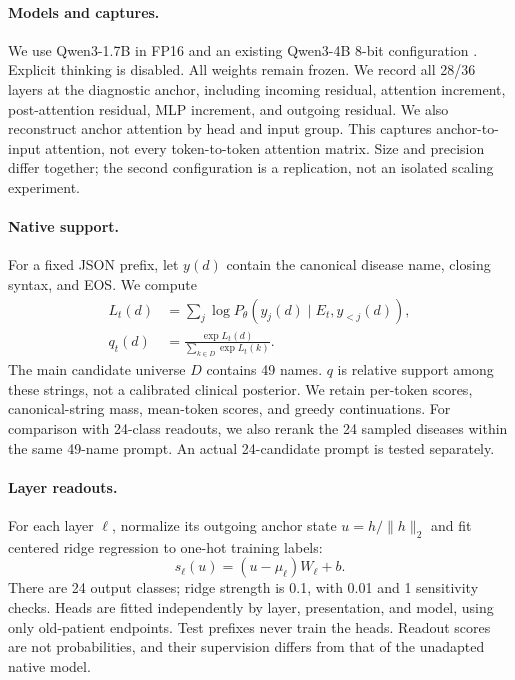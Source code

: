 \documentclass[11pt]{article}
\begin{document}
\paragraph{Models and captures.}
We use Qwen3-1.7B in FP16 and an existing Qwen3-4B 8-bit configuration \citep{qwen3}. Explicit thinking is disabled. All weights remain frozen. We record all 28/36 layers at the diagnostic anchor, including incoming residual, attention increment, post-attention residual, MLP increment, and outgoing residual. We also reconstruct anchor attention by head and input group. This captures anchor-to-input attention, not every token-to-token attention matrix. Size and precision differ together; the second configuration is a replication, not an isolated scaling experiment.

\paragraph{Native support.}
For a fixed JSON prefix, let $y(d)$ contain the canonical disease name, closing syntax, and EOS. We compute
\begin{align}
 L_t(d)&=\sum_j\log P_\theta(y_j(d)\mid E_t,y_{<j}(d)),\\
 q_t(d)&=\frac{\exp L_t(d)}{\sum_{k\in D}\exp L_t(k)}.
\end{align}
The main candidate universe $D$ contains 49 names. $q$ is relative support among these strings, not a calibrated clinical posterior. We retain per-token scores, canonical-string mass, mean-token scores, and greedy continuations. For comparison with 24-class readouts, we also rerank the 24 sampled diseases within the same 49-name prompt. An actual 24-candidate prompt is tested separately.

\paragraph{Layer readouts.}
For each layer $\ell$, normalize its outgoing anchor state $u=h/\lVert h\rVert_2$ and fit centered ridge regression to one-hot training labels:
\begin{equation}
 s_\ell(u)=(u-\mu_\ell)W_\ell+b.
\end{equation}
There are 24 output classes; ridge strength is 0.1, with 0.01 and 1 sensitivity checks. Heads are fitted independently by layer, presentation, and model, using only old-patient endpoints. Test prefixes never train the heads. Readout scores are not probabilities, and their supervision differs from that of the unadapted native model.
\end{document}

